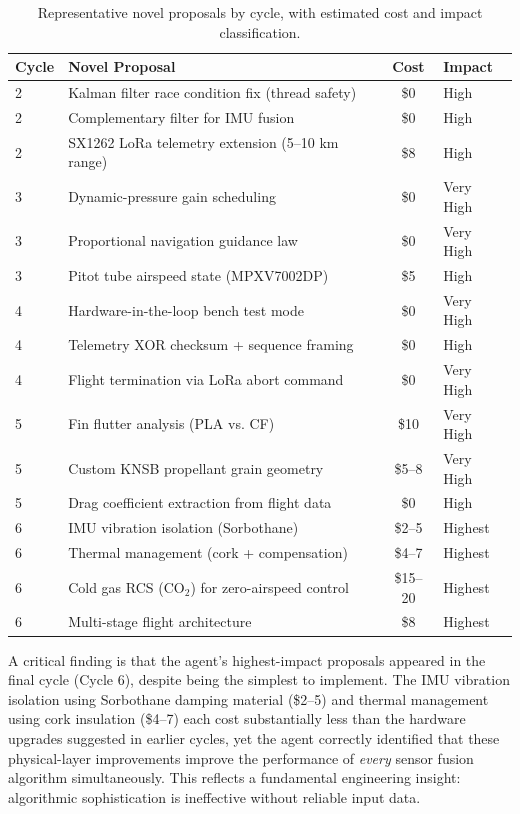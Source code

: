 \documentclass[11pt,letterpaper]{article}
\begin{document}
\begin{table}[htbp]
\centering
\caption{Representative novel proposals by cycle, with estimated cost and impact classification.}
\label{tab:novel-ideas}
\begin{tabular}{p{2.5cm} p{6cm} c l}
\toprule
\textbf{Cycle} & \textbf{Novel Proposal} & \textbf{Cost} & \textbf{Impact} \\
\midrule
2 & Kalman filter race condition fix (thread safety) & \$0 & High \\
2 & Complementary filter for IMU fusion & \$0 & High \\
2 & SX1262 LoRa telemetry extension (5--10 km range) & \$8 & High \\
3 & Dynamic-pressure gain scheduling & \$0 & Very High \\
3 & Proportional navigation guidance law & \$0 & Very High \\
3 & Pitot tube airspeed state (MPXV7002DP) & \$5 & High \\
4 & Hardware-in-the-loop bench test mode & \$0 & Very High \\
4 & Telemetry XOR checksum + sequence framing & \$0 & High \\
4 & Flight termination via LoRa abort command & \$0 & Very High \\
5 & Fin flutter analysis (PLA vs. CF) & \$10 & Very High \\
5 & Custom KNSB propellant grain geometry & \$5--8 & Very High \\
5 & Drag coefficient extraction from flight data & \$0 & High \\
6 & IMU vibration isolation (Sorbothane) & \$2--5 & Highest \\
6 & Thermal management (cork + compensation) & \$4--7 & Highest \\
6 & Cold gas RCS (CO$_2$) for zero-airspeed control & \$15--20 & Highest \\
6 & Multi-stage flight architecture & \$8 & Highest \\
\bottomrule
\end{tabular}
\end{table}

A critical finding is that the agent's highest-impact proposals appeared in the final cycle (Cycle 6), despite being the simplest to implement. The IMU vibration isolation using Sorbothane damping material (\$2--5) and thermal management using cork insulation (\$4--7) each cost substantially less than the hardware upgrades suggested in earlier cycles, yet the agent correctly identified that these physical-layer improvements improve the performance of \emph{every} sensor fusion algorithm simultaneously. This reflects a fundamental engineering insight: algorithmic sophistication is ineffective without reliable input data.
\end{document}
